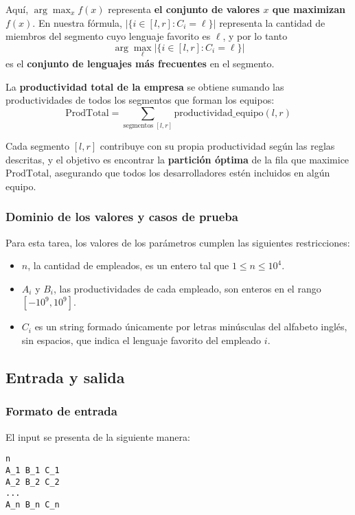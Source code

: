 Aquí, $\arg\max_x f(x)$ representa \textbf{el conjunto de valores $x$ que maximizan $f(x)$}. En nuestra fórmula, $|\{ i \in [l,r] : C_i = \ell \}|$ representa la cantidad de miembros del segmento cuyo lenguaje favorito es $\ell$, y por lo tanto
\[
\arg\max_\ell |\{ i \in [l,r] : C_i = \ell \}|
\]
es el \textbf{conjunto de lenguajes más frecuentes} en el segmento.

La \textbf{productividad total de la empresa} se obtiene sumando las productividades de todos los segmentos que forman los equipos:
\[
\text{ProdTotal} = \sum_{\text{segmentos } [l,r]} \text{productividad\_equipo}(l,r)
\]

Cada segmento $[l,r]$ contribuye con su propia productividad según las reglas descritas, y el objetivo es encontrar la \textbf{partición óptima} de la fila que maximice $\text{ProdTotal}$, asegurando que todos los desarrolladores estén incluidos en algún equipo.

\subsubsection*{Dominio de los valores y casos de prueba}

Para esta tarea, los valores de los parámetros cumplen las siguientes restricciones:

\begin{itemize}
    \item $n$, la cantidad de empleados, es un entero tal que $1 \le n \le 10^4$.
    \item $A_i$ y $B_i$, las productividades de cada empleado, son enteros en el rango $[-10^9, 10^9]$.
    \item $C_i$ es un string formado únicamente por letras minúsculas del alfabeto inglés, sin espacios, que indica el lenguaje favorito del empleado $i$.
\end{itemize}

\subsection{Entrada y salida}

\subsubsection*{Formato de entrada}

El input se presenta de la siguiente manera:

\begin{verbatim}
n
A_1 B_1 C_1
A_2 B_2 C_2
...
A_n B_n C_n
\end{verbatim}

